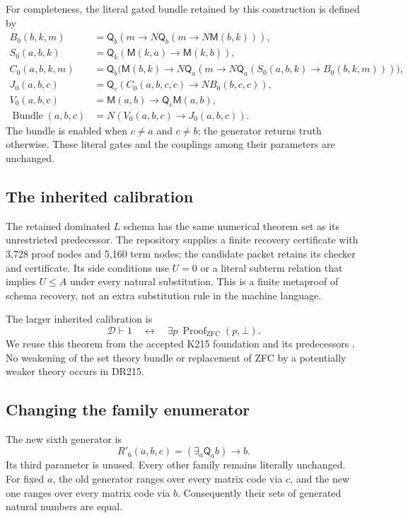 \documentclass[11pt,a4paper]{article}
\theoremstyle{definition}
\newcommand{\qnt}{\mathsf Q}
\newcommand{\mem}{\mathsf M}
\newcommand{\calD}{\mathcal D}
\numberwithin{equation}{section}
\begin{document}
For completeness, the literal gated bundle retained by this construction
is defined by
\begin{align*}
 B_0(b,k,m)&=\qnt_b(m\to N\qnt_b(m\to N\mem(b,k))),\\
 S_0(a,b,k)&=\qnt_k(\mem(k,a)\to\mem(k,b)),\\
 C_0(a,b,k,m)&=\qnt_b\bigl(\mem(b,k)\to
       N\qnt_a(m\to N\qnt_a(S_0(a,b,k)\to B_0(b,k,m)))\bigr),\\
 J_0(a,b,c)&=\qnt_c(C_0(a,b,c,c)\to NB_0(b,c,c)),\\
 V_0(a,b,c)&=\mem(a,b)\to\qnt_c\mem(a,b),\\
 \operatorname{Bundle}(a,b,c)&=N(V_0(a,b,c)\to J_0(a,b,c)).
\end{align*}
The bundle is enabled when $c\ne a$ and $c\ne b$; the generator returns
truth otherwise. These literal gates and the couplings among their
parameters are unchanged.

\subsection{The inherited calibration}

The retained dominated $L$ schema has the same numerical theorem set as
its unrestricted predecessor. The repository supplies a finite recovery
certificate with 3,728 proof nodes and 5,160 term nodes; the candidate
packet retains its checker and certificate. Its side conditions use
$U=0$ or a literal subterm relation that implies $U\le A$ under every
natural substitution. This is a finite metaproof of schema recovery,
not an extra substitution rule in the machine language.

The larger inherited calibration is
\begin{equation}
 \calD\vdash1
 \quad\longleftrightarrow\quad
 \exists p\ \operatorname{Proof}_{\mathrm{ZFC}}(p,\bot).
 \label{eq:calibration}
\end{equation}
We reuse this theorem from the accepted K215 foundation and its
predecessors \cite{k215,direct,rho6,dominated}. No weakening of the set
theory bundle or replacement of ZFC by a potentially weaker theory occurs
in DR215.

\subsection{Changing the family enumerator}

The new sixth generator is
\begin{equation}
 R'_6(a,b,c)=(\exists_a\qnt_a b)\to b.
 \label{eq:rho6new}
\end{equation}
Its third parameter is unused. Every other family remains literally
unchanged. For fixed $a$, the old generator ranges over every matrix
code via $c$, and the new one ranges over every matrix code via $b$.
Consequently their sets of generated natural numbers are equal.
\end{document}
